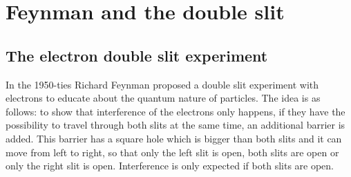 \chapter{Feynman and the double slit}
\section{The electron double slit experiment}
In the 1950-ties Richard Feynman proposed a double slit experiment with electrons to educate about the quantum nature of particles. The idea is as follows: to show that interference of the electrons only happens, if they have the possibility to travel through both slits at the same time, an additional barrier is added. This barrier has a square hole which is bigger than both slits and it can move from left to right, so that only the left slit is open, both slits are open or only the right slit is open. Interference is only expected if both slits are open.


